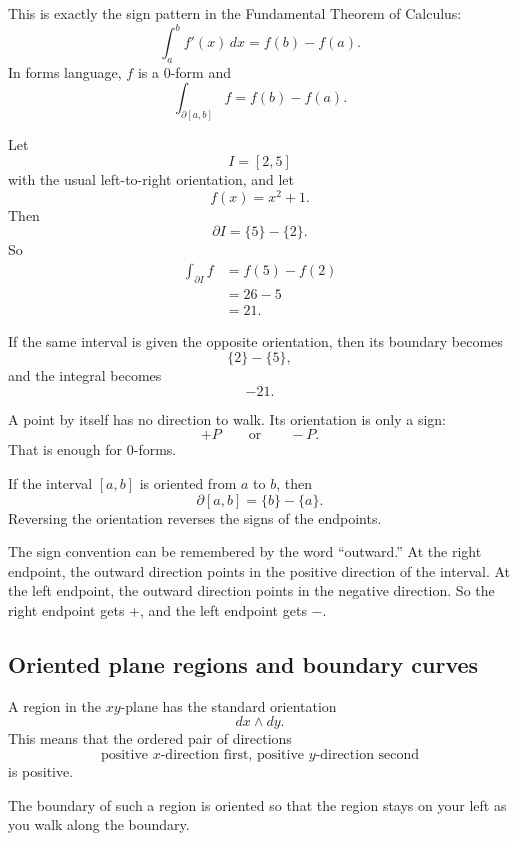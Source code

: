 This is exactly the sign pattern in the Fundamental Theorem of Calculus:
\[
    \int_a^b f'(x)\,dx=f(b)-f(a).
\]
In forms language, \(f\) is a \(0\)-form and
\[
    \int_{\partial[a,b]} f=f(b)-f(a).
\]

\begin{example}
Let
\[
    I=[2,5]
\]
with the usual left-to-right orientation, and let
\[
    f(x)=x^2+1.
\]
Then
\[
    \partial I=\{5\}-\{2\}.
\]
So
\[
\begin{aligned}
    \int_{\partial I} f
    &=
    f(5)-f(2)\\
    &=
    26-5\\
    &=
    21.
\end{aligned}
\]

If the same interval is given the opposite orientation, then its boundary becomes
\[
    \{2\}-\{5\},
\]
and the integral becomes
\[
    -21.
\]
\end{example}

A point by itself has no direction to walk.  Its orientation is only a sign:
\[
    +P
    \qquad\text{or}\qquad
    -P.
\]
That is enough for \(0\)-forms.

\begin{definition}
If the interval \([a,b]\) is oriented from \(a\) to \(b\), then
\[
\boxed{
    \partial[a,b]=\{b\}-\{a\}.
}
\]
Reversing the orientation reverses the signs of the endpoints.
\end{definition}

The sign convention can be remembered by the word ``outward.''  At the right endpoint,
the outward direction points in the positive direction of the interval.  At the left
endpoint, the outward direction points in the negative direction.  So the right endpoint
gets \(+\), and the left endpoint gets \(-\).

\subsection{Oriented plane regions and boundary curves}

A region in the \(xy\)-plane has the standard orientation
\[
    dx\wedge dy.
\]
This means that the ordered pair of directions
\[
    \text{positive }x\text{-direction first, positive }y\text{-direction second}
\]
is positive.

The boundary of such a region is oriented so that the region stays on your left as you
walk along the boundary.

